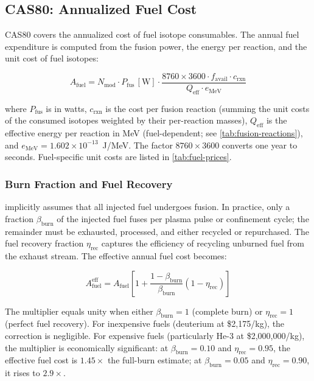 \documentclass{article}
\begin{document}
\subsection{CAS80: Annualized Fuel Cost}
\label{sec:cas80}

CAS80 covers the annualized cost of fuel isotope consumables. The
annual fuel expenditure is computed from the fusion power, the
energy per reaction, and the unit cost of fuel isotopes:

\begin{equation}
\label{eq:cas80-base}
A_{\text{fuel}} = N_{\text{mod}} \cdot P_{\text{fus}}\,[\text{W}] \cdot
  \frac{8760 \times 3600 \cdot f_{\text{avail}} \cdot c_{\text{rxn}}}
       {Q_{\text{eff}} \cdot e_{\text{MeV}}}
\end{equation}

\noindent where $P_{\text{fus}}$ is in watts, $c_{\text{rxn}}$ is the cost per fusion reaction
(summing the unit costs of the consumed isotopes weighted by their
per-reaction masses), $Q_{\text{eff}}$ is the effective energy per
reaction in MeV (fuel-dependent; see \cref{tab:fusion-reactions}), and
$e_{\text{MeV}} = 1.602 \times 10^{-13}$~J/MeV. The factor
$8760 \times 3600$ converts one year to seconds. Fuel-specific
unit costs are listed in \cref{tab:fuel-prices}.

\subsubsection{Burn Fraction and Fuel Recovery}
 implicitly assumes that all injected fuel
undergoes fusion. In practice, only a fraction $\beta_{\text{burn}}$
of the injected fuel fuses per plasma pulse or confinement cycle;
the remainder must be exhausted, processed, and either recycled or
repurchased. The fuel recovery fraction $\eta_{\text{rec}}$ captures
the efficiency of recycling unburned fuel from the exhaust stream.
The effective annual fuel cost becomes:

\begin{equation}
\label{eq:cas80-burn}
A_{\text{fuel}}^{\text{eff}} = A_{\text{fuel}} \left[
  1 + \frac{1 - \beta_{\text{burn}}}{\beta_{\text{burn}}}
      \left(1 - \eta_{\text{rec}}\right)
\right]
\end{equation}

\noindent The multiplier equals unity when either
$\beta_{\text{burn}} = 1$ (complete burn) or
$\eta_{\text{rec}} = 1$ (perfect fuel recovery). For inexpensive
fuels (deuterium at \$2{,}175/kg), the correction is negligible.
For expensive fuels (particularly He-3 at \$2{,}000{,}000/kg),
the multiplier is economically significant: at
$\beta_{\text{burn}} = 0.10$ and $\eta_{\text{rec}} = 0.95$,
the effective fuel cost is $1.45\times$ the full-burn estimate;
at $\beta_{\text{burn}} = 0.05$ and $\eta_{\text{rec}} = 0.90$,
it rises to $2.9\times$.
\end{document}
